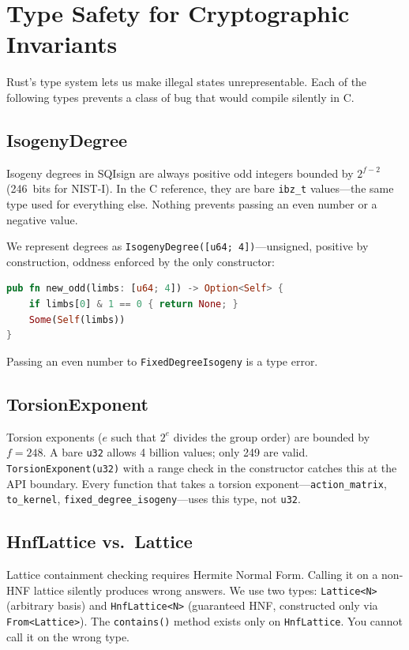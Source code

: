 \section{Type Safety for Cryptographic Invariants}
\label{sec:types}

Rust's type system lets us make illegal states unrepresentable.  Each
of the following types prevents a class of bug that would compile
silently in C.

\subsection{IsogenyDegree}

Isogeny degrees in SQIsign are always positive odd integers bounded
by $2^{f-2}$ (246~bits for NIST-I).  In the C reference, they are
bare \texttt{ibz\_t} values---the same type used for everything else.
Nothing prevents passing an even number or a negative value.

We represent degrees as \texttt{IsogenyDegree([u64; 4])}---unsigned,
positive by construction, oddness enforced by the only constructor:
\begin{lstlisting}[language=Rust]
pub fn new_odd(limbs: [u64; 4]) -> Option<Self> {
    if limbs[0] & 1 == 0 { return None; }
    Some(Self(limbs))
}
\end{lstlisting}
Passing an even number to \texttt{FixedDegreeIsogeny} is a type error.

\subsection{TorsionExponent}

Torsion exponents ($e$ such that $2^e$ divides the group order) are
bounded by $f = 248$.  A bare \texttt{u32} allows 4 billion values;
only 249 are valid.  \texttt{TorsionExponent(u32)} with a range check
in the constructor catches this at the API boundary.  Every function
that takes a torsion exponent---\texttt{action\_matrix},
\texttt{to\_kernel}, \texttt{fixed\_degree\_isogeny}---uses this type,
not \texttt{u32}.

\subsection{HnfLattice vs.\ Lattice}

Lattice containment checking requires Hermite Normal Form.  Calling
it on a non-HNF lattice silently produces wrong answers.  We use two
types: \texttt{Lattice<N>} (arbitrary basis) and \texttt{HnfLattice<N>}
(guaranteed HNF, constructed only via \texttt{From<Lattice>}).  The
\texttt{contains()} method exists only on \texttt{HnfLattice}.  You
cannot call it on the wrong type.

